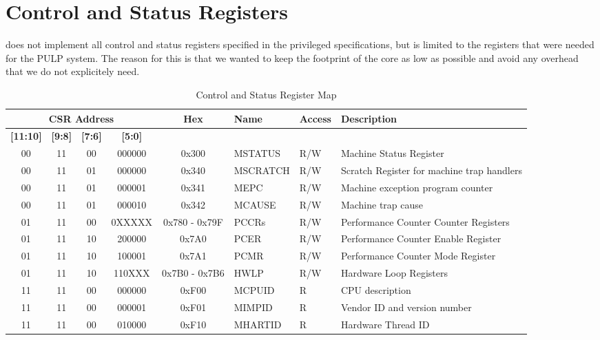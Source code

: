 \chapter{Control and Status Registers}
\label{chap:csr}

\rvcore does not implement all control and status registers specified in the
\riscv privileged specifications, but is limited to the registers that were
needed for the PULP system.
The reason for this is that we wanted to keep the footprint of the core as low
as possible and avoid any overhead that we do not explicitely need.

\begin{landscape}
\begin{table}[H]
 \caption{Control and Status Register Map}
 \label{tab:csr_map}
 \centering\begin{tabularx}{\linewidth}{@{}|cccc|c|l|l|X|@{}} \toprule
   \multicolumn{4}{|c|}{\textbf{CSR Address}} & \textbf{Hex} & \textbf{Name} & \textbf{Access}  & \textbf{Description} \\ \hline
   \textbf{[11:10]} & \textbf{[9:8]} & \textbf{[7:6]} & \textbf{[5:0]} & & & & \\ \toprule
   00 & 11 & 00 & 000000  & 0x300         & MSTATUS  & R/W & Machine Status Register \\ \hline
   00 & 11 & 01 & 000000  & 0x340         & MSCRATCH & R/W & Scratch Register for machine trap handlers \\ \hline
   00 & 11 & 01 & 000001  & 0x341         & MEPC     & R/W & Machine exception program counter \\ \hline
   00 & 11 & 01 & 000010  & 0x342         & MCAUSE   & R/W & Machine trap cause \\ \hline
   01 & 11 & 00 & 0XXXXX  & 0x780 - 0x79F & PCCRs    & R/W & Performance Counter Counter Registers \\ \hline
   01 & 11 & 10 & 200000  & 0x7A0         & PCER     & R/W & Performance Counter Enable Register \\ \hline
   01 & 11 & 10 & 100001  & 0x7A1         & PCMR     & R/W & Performance Counter Mode Register \\ \hline
   01 & 11 & 10 & 110XXX  & 0x7B0 - 0x7B6 & HWLP     & R/W & Hardware Loop Registers \\ \hline
   11 & 11 & 00 & 000000  & 0xF00         & MCPUID   & R   & CPU description  \\ \hline
   11 & 11 & 00 & 000001  & 0xF01         & MIMPID   & R   & Vendor ID and version number \\ \hline
   11 & 11 & 00 & 010000  & 0xF10         & MHARTID  & R   & Hardware Thread ID \\ \bottomrule
  \end{tabularx}
\end{table}
\end{landscape}

